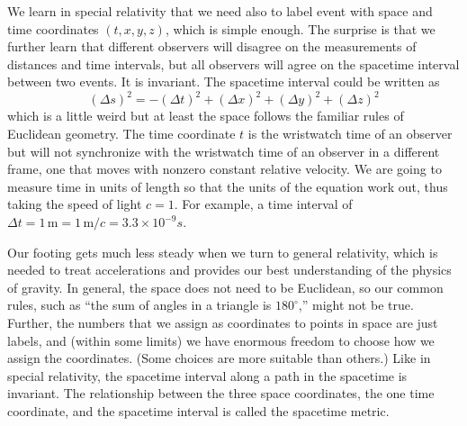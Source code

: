 We learn in special relativity that we need also to label event with space and time coordinates $(t,x,y,z)$, which is simple enough.  The surprise is that we further learn that different observers will disagree on the measurements of distances and time intervals, but all observers will agree on the spacetime interval between two events.  It is invariant.  The spacetime interval could be written as
\begin{equation}
  (\Delta s)^2 = -(\Delta t)^2 +  (\Delta x)^2 + (\Delta y)^2 + (\Delta z)^2
\end{equation}
which is a little weird but at least the space follows the familiar rules of Euclidean geometry.  The time coordinate $t$ is the wristwatch time of an observer but will not synchronize with the wristwatch time of an observer in a different frame, one that moves with nonzero constant relative velocity.  We are going to measure time in units of length so that the units of the equation work out, thus taking the speed of light $c=1$.  For example, a time interval of $\Delta t = 1\,\mbox{m} = 1\,\mbox{m}/c = 3.3\times10^{-9} s$.

Our footing gets much less steady when we turn to general relativity, which is needed to treat accelerations and provides our best understanding of the physics of gravity.  In general, the space does not need to be Euclidean, so our common rules, such as ``the sum of angles in a triangle is $180^\circ$,'' might not be true.  Further, the numbers that we assign as coordinates to points in space are just labels, and (within some limits) we have enormous freedom to choose how we assign the coordinates.  (Some choices are more suitable than others.)  Like in special relativity, the spacetime interval along a path in the spacetime is invariant.  The relationship between the three space coordinates, the one time coordinate, and the spacetime interval is called the spacetime metric.

